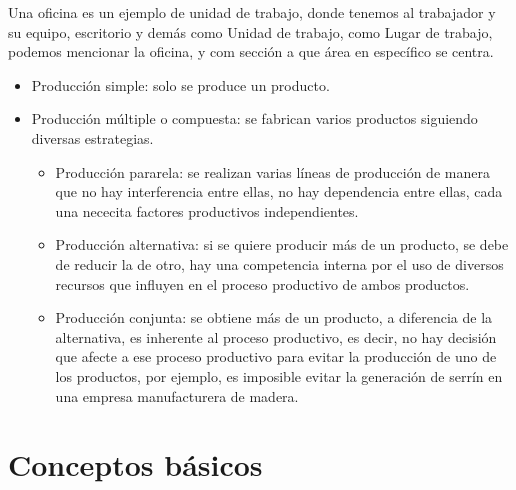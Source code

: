 \documentclass[12pt]{report} %
\providecommand{\tightlist}{%
  \setlength{\itemsep}{0pt}\setlength{\parskip}{0pt}}
\begin{document}
\begin{ejemplo}
Una oficina es un ejemplo de unidad de trabajo, donde tenemos al trabajador y su equipo, escritorio y demás como Unidad de trabajo, como Lugar de trabajo, podemos mencionar la oficina, y com sección a que área en específico se centra.
\end{ejemplo}

\begin{itemize}
\tightlist
\item
  Producción simple: solo se produce un producto.
\item
  Producción múltiple o compuesta: se fabrican varios productos
  siguiendo diversas estrategias.

  \begin{itemize}
  \tightlist
  \item
    Producción pararela: se realizan varias líneas de producción de
    manera que no hay interferencia entre ellas, no hay dependencia
    entre ellas, cada una nececita factores productivos independientes.
  \item
    Producción alternativa: si se quiere producir más de un producto, se
    debe de reducir la de otro, hay una competencia interna por el uso
    de diversos recursos que influyen en el proceso productivo de ambos
    productos.
  \item
    Producción conjunta: se obtiene más de un producto, a diferencia de
    la alternativa, es inherente al proceso productivo, es decir, no hay
    decisión que afecte a ese proceso productivo para evitar la
    producción de uno de los productos, por ejemplo, es imposible evitar
    la generación de serrín en una empresa manufacturera de madera.
  \end{itemize}
\end{itemize}





\hypertarget{conceptos-buxe1sicos}{%
\chapter{Conceptos básicos}\label{conceptos-buxe1sicos}}
\end{document}
